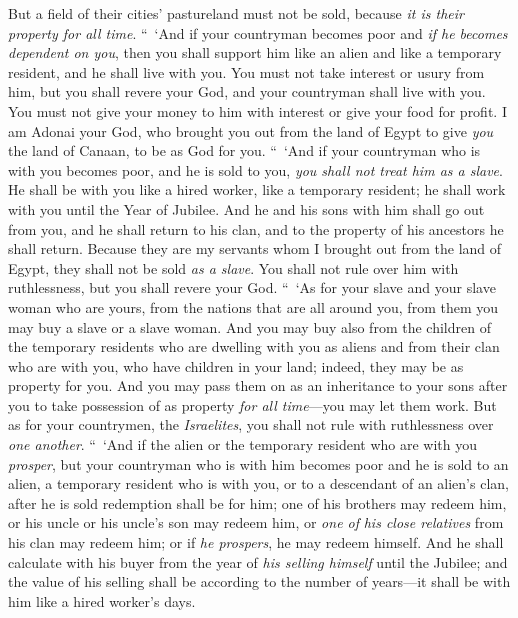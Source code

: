 \begin{biblechapter}
\verse But a field of their cities’ pastureland must not be sold, because \textit{it is their property for all time}.
\verse “ ‘And if your countryman becomes poor and \textit{if he becomes dependent on you}, then you shall support him like an alien and like a temporary resident, and he shall live with you.
\verse You must not take interest or usury from him, but you shall revere your God, and your countryman shall live with you.
\verse You must not give your money to him with interest or give your food for profit.
\verse I am Adonai your God, who brought you out from the land of Egypt to give \textit{you} the land of Canaan, to be as God for you.
\verse “ ‘And if your countryman who is with you becomes poor, and he is sold to you, \textit{you shall not treat him as a slave}.
\verse He shall be with you like a hired worker, like a temporary resident; he shall work with you until the Year of Jubilee.
\verse And he and his sons with him shall go out from you, and he shall return to his clan, and to the property of his ancestors he shall return.
\verse Because they are my servants whom I brought out from the land of Egypt, they shall not be sold \textit{as a slave}.
\verse You shall not rule over him with ruthlessness, but you shall revere your God.
\verse “ ‘As for your slave and your slave woman who are yours, from the nations that are all around you, from them you may buy a slave or a slave woman.
\verse And you may buy also from the children of the temporary residents who are dwelling with you as aliens and from their clan who are with you, who have children in your land; indeed, they may be as property for you.
\verse And you may pass them on as an inheritance to your sons after you to take possession of as property \textit{for all time}—you may let them work. But as for your countrymen, the \textit{Israelites}, you shall not rule with ruthlessness over \textit{one another}.
\verse “ ‘And if the alien or the temporary resident who are with you \textit{prosper}, but your countryman who is with him becomes poor and he is sold to an alien, a temporary resident who is with you, or to a descendant of an alien’s clan,
\verse after he is sold redemption shall be for him; one of his brothers may redeem him,
\verse or his uncle or his uncle’s son may redeem him, or \textit{one of} \textit{his close relatives} from his clan may redeem him; or if \textit{he prospers}, he may redeem himself.
\verse And he shall calculate with his buyer from the year of \textit{his selling himself} until the Jubilee; and the value of his selling shall be according to the number of years—it shall be with him like a hired worker’s days.

\end{biblechapter}
